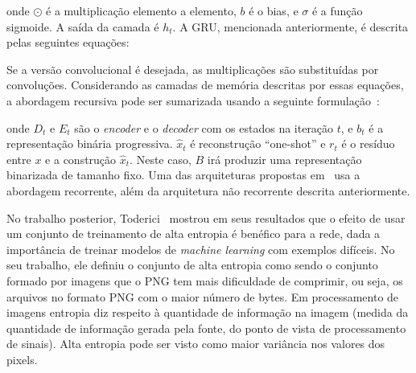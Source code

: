 \noindent onde $\odot$ é a multiplicação elemento a elemento, $b$ é o bias, e $\sigma$ é a função sigmoide. A saída da camada é $h_t$. A \acrshort{GRU}, mencionada anteriormente, é descrita pelas seguintes equações:

Se a versão convolucional é desejada, as multiplicações são substituídas por convoluções. Considerando as camadas de memória descritas por essas equações, a abordagem recursiva pode ser sumarizada usando a seguinte formulação~\cite{FullResolution2017Toderici}:

\noindent onde $D_t$ e $E_t$ são o \textit{encoder} e o \textit{decoder} com os estados na iteração $t$, e $b_t$ é a representação binária progressiva. $\hat{x}_t$ é reconstrução ``one-shot'' e $r_t$ é o resíduo entre $x$ e a construção $\hat{x}_t$. Neste caso, $B$ irá produzir uma representação binarizada de tamanho fixo. Uma das arquiteturas propostas em~\cite{Variable2016Toderici} usa a abordagem recorrente, além da arquitetura não recorrente descrita anteriormente.

No trabalho posterior, Toderici~\cite{FullResolution2017Toderici} mostrou em seus resultados que o efeito de usar um conjunto de treinamento de alta entropia é benéfico para a rede, dada a importância de treinar modelos de \textit{machine learning} com exemplos difíceis. No seu trabalho, ele definiu o conjunto de alta entropia como sendo o conjunto formado por imagens que o \acrshort{PNG} tem mais dificuldade de comprimir, ou seja, os arquivos no formato \acrshort{PNG} com o maior número de bytes. Em processamento de imagens entropia diz respeito à quantidade de informação na imagem (medida da quantidade de informação gerada pela fonte, do ponto de vista de processamento de sinais). Alta entropia pode ser visto como maior variância nos valores dos pixels.
